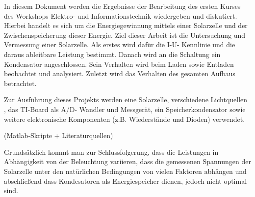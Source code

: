 \documentclass{etit-workshop-protokoll}
\begin{document}
\maketitle

\pagestyle{empty}%

    \par In diesem Dokument werden die Ergebnisse der Bearbeitung des ersten Kurses des Workshops Elektro-
    und Informationstechnik wiedergeben und diskutiert. Hierbei handelt es sich um die Energiegewinnung
    mittels einer Solarzelle und der Zwischenspeicherung dieser Energie.
    Ziel dieser Arbeit ist die Untersuchung und Vermessung einer Solarzelle. Als erstes wird dafür die I-U-
    Kennlinie und die daraus ableitbare Leistung bestimmt. Danach wird an die Schaltung ein Kondensator
    angeschlossen. Sein Verhalten wird beim Laden sowie Entladen beobachtet und analysiert. Zuletzt wird
    das Verhalten des gesamten Aufbaus betrachtet.
    \par Zur Ausführung dieses Projekts werden eine Solarzelle, verschiedene Lichtquellen , das TI-Board als A/D-
    Wandler und Messgerät, ein Speicherkondensator sowie weitere elektronische Komponenten (z.B.
    Wiederstände und Dioden) verwendet.
    \par (Matlab-Skripte + Literaturquellen)
    \par Grundsätzlich kommt man zur Schlussfolgerung, dass die Leistungen in Abhängigkeit von der
    Beleuchtung variieren, dass die gemessenen Spannungen der Solarzelle unter den natürlichen
    Bedingungen von vielen Faktoren abhängen und abschließend dass Kondesatoren als Energiespeicher
    dienen, jedoch nicht optimal sind.

\clearpage %
\pagestyle{scrheadings} %

\tableofcontents
\listoffigures
\listoftables
\clearpage %
\end{document}
